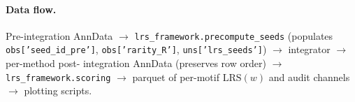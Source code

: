 \paragraph{Data flow.}
Pre-integration AnnData $\to$ \texttt{lrs\_framework.precompute\_seeds}
(populates \texttt{obs['seed\_id\_pre']}, \texttt{obs['rarity\_R']},
\texttt{uns['lrs\_seeds']}) $\to$ integrator $\to$ per-method post-%
integration AnnData (preserves row order) $\to$
\texttt{lrs\_framework.scoring} $\to$ parquet of per-motif $\mathrm{LRS}(w)$
and audit channels $\to$ plotting scripts.
